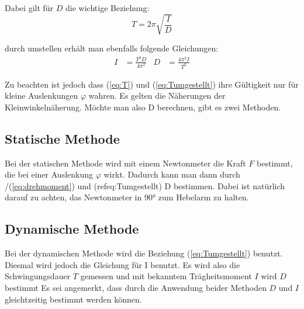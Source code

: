 Dabei gilt für $D$ die wichtige Beziehung:
\begin{equation} \label{eq:T}
    T = 2\pi \sqrt{\frac{I}{D}}
\end{equation}

durch umstellen erhält man ebenfalls folgende Gleichungen:
\begin{align} \label{eq:Tumgestellt}
    I & = \frac{T^2D}{4\pi^2} & D & = \frac{4\pi^2I}{T^2} 
\end{align}

Zu beachten ist jedoch dass (\ref{eq:T}) und (\ref{eq:Tumgestellt}) ihre Gültigkeit nur für kleine Auslenkungen $\varphi$ wahren.
Es gelten die Näherungen der Kleinwinkelnäherung.
Möchte man also D berechnen, gibt es zwei Methoden.

\subsection*{Statische Methode}
Bei der statischen Methode wird mit einem Newtonmeter die Kraft $F$ bestimmt, die bei einer Auslenkung $\varphi$ wirkt.
Dadurch kann man dann durch /(\ref{eq:drehmoment}) und (ref{eq:Tumgestellt}) D bestimmen.
Dabei ist natürlich darauf zu achten, das Newtonmeter in 90° zum Hebelarm zu halten.

\subsection*{Dynamische Methode}
Bei der dynamischen Methode wird die Beziehung (\ref{eq:Tumgestellt}) benutzt.
Diesmal wird jedoch die Gleichung für I benutzt.
Es wird also die Schwingungsdauer $T$ gemessen und mit bekanntem Trägheitsmoment $I$ wird  $D$ bestimmt
Es sei angemerkt, dass durch die Anwendung beider Methoden $D$ und $I$ gleichtzeitig bestimmt werden können.